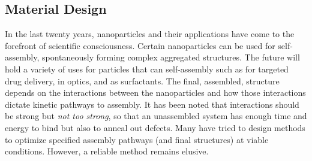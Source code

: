 \documentclass[11pt]{article}
\begin{document}


\subsection*{Material Design}

In the last twenty years, nanoparticles and their applications have come to the forefront of scientific consciousness.
Certain nanoparticles can be used for self-assembly, spontaneously forming complex aggregated structures. The future will hold a variety of uses for particles that can self-assembly such as for targeted drug delivery,
in optics,
and as surfactants.
The final, assembled, structure depends on the interactions between the nanoparticles and how those interactions dictate kinetic pathways to assembly. It has been noted that interactions should be strong but {\it not too strong}, so that an unassembled system has enough time and energy to bind but also to anneal out defects.
Many have tried to design methods to optimize specified assembly pathways (and final structures) at viable conditions.  However, a reliable method remains elusive. 
\end{document}
